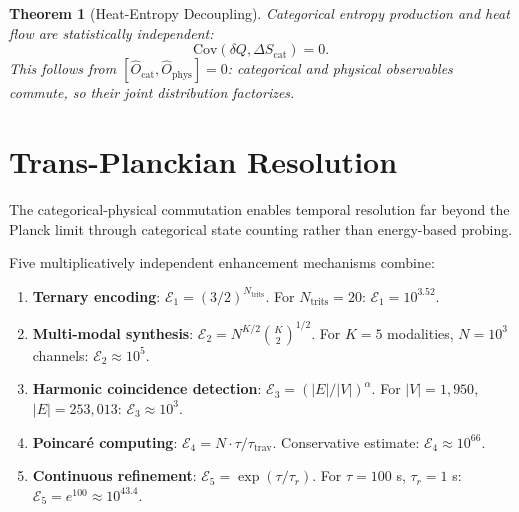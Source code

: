 \documentclass[twocolumn,10pt]{article}
\newtheorem{theorem}{Theorem}[section]
\theoremstyle{definition}
\newcommand{\Ocat}{\hat{O}_{\mathrm{cat}}}
\newcommand{\Ophys}{\hat{O}_{\mathrm{phys}}}
\begin{document}
\begin{theorem}[Heat-Entropy Decoupling]\label{thm:decoupling}
Categorical entropy production and heat flow are statistically independent:
\begin{equation}\label{eq:decoupling}
    \mathrm{Cov}(\delta Q, \Delta S_{\mathrm{cat}}) = 0.
\end{equation}
This follows from $[\Ocat, \Ophys] = 0$: categorical and physical observables commute, so their joint distribution factorizes.
\end{theorem}

\section{Trans-Planckian Resolution}\label{sec:trans_planckian}

The categorical-physical commutation enables temporal resolution far beyond the Planck limit through categorical state counting rather than energy-based probing.

Five multiplicatively independent enhancement mechanisms combine:

\begin{enumerate}[nosep]
    \item \textbf{Ternary encoding}: $\mathcal{E}_1 = (3/2)^{N_{\mathrm{trits}}}$. For $N_{\mathrm{trits}} = 20$: $\mathcal{E}_1 = 10^{3.52}$.

    \item \textbf{Multi-modal synthesis}: $\mathcal{E}_2 = N^{K/2}\binom{K}{2}^{1/2}$. For $K = 5$ modalities, $N = 10^3$ channels: $\mathcal{E}_2 \approx 10^5$.

    \item \textbf{Harmonic coincidence detection}: $\mathcal{E}_3 = (|E|/|V|)^\alpha$. For $|V| = 1{,}950$, $|E| = 253{,}013$: $\mathcal{E}_3 \approx 10^3$.

    \item \textbf{Poincar\'e computing}: $\mathcal{E}_4 = N \cdot \tau/\tau_{\mathrm{trav}}$. Conservative estimate: $\mathcal{E}_4 \approx 10^{66}$.

    \item \textbf{Continuous refinement}: $\mathcal{E}_5 = \exp(\tau/\tau_r)$. For $\tau = 100$ s, $\tau_r = 1$ s: $\mathcal{E}_5 = e^{100} \approx 10^{43.4}$.
\end{enumerate}
\end{document}
